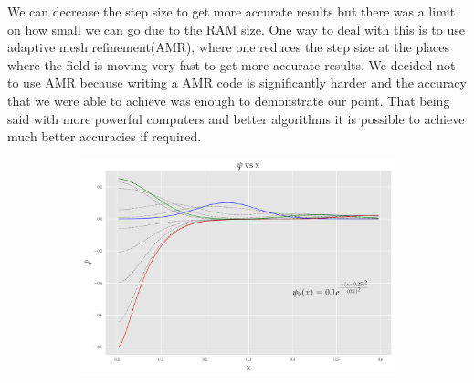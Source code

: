 We can decrease the step size to get more accurate results but there was a limit on how small we can go due to the RAM size. One way to deal with this is to use adaptive mesh refinement(AMR), where one reduces the step size at the places where the field is moving very fast to get more accurate results. We decided not to use AMR because writing a AMR code is significantly harder and the accuracy that we were able to achieve was enough to demonstrate our point. That being said with more powerful computers and better algorithms it is possible to achieve much better accuracies if required.



\begin{figure}
    \centering
    \begin{subfigure}[b]{0.85\textwidth}
        \includegraphics[width=1\linewidth]{images/super_Gaussian.pdf}
        \caption{}
        \label{fig:Ng1}
    \end{subfigure}


\end{figure}

